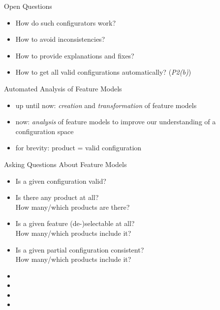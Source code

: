 \begin{frame}{\myframetitle}
	\begin{fancycolumns}
		\begin{note}{Open Questions}
			\begin{itemize}
				\item How do such configurators work?
				\item How to avoid inconsistencies?
				\item How to provide explanations and fixes? %
    			\item How to get all valid configurations automatically? (\emph{P2(b)})
			\end{itemize}
		\end{note}
		\begin{definition}{Automated Analysis of Feature Models}
			\begin{itemize}
				\item up until now: \emph{creation} and \emph{transformation} of feature models
				\item now: \emph{analysis} of feature models to improve our understanding of a configuration space
				\item for brevity: product = valid configuration
			\end{itemize}
		\end{definition}
	\nextcolumn
		\begin{example}{Asking Questions About Feature Models}
			\begin{itemize}
				\item Is a given configuration valid?
				\item Is there any product at all?\\
					How many/which products are there?\\
				\item Is a given feature (de-)selectable at all?\\
					How many/which products include it?\\
				\item Is a given partial configuration consistent?\\
					How many/which products include it?\\
				\item \color{gray}{(Which features always occur together?)}
				\item \color{gray}{(Is a given constraint redundant?)}
				\item \color{gray}{(How do two feature model versions differ?)}
				\item \color{gray}{(Why is \ldots? How to fix \ldots?)}
			\end{itemize}
		\end{example}
	\end{fancycolumns}
\end{frame}

